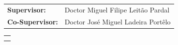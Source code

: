 {\vspace*{15mm}

%
%
\hspace*{-10.5mm}
\begin{tabular}{p{35mm}p{110.5mm}}
{\sffamily\large {\bf Supervisor:}}
& {\sffamily\large Doctor Miguel Filipe Leit\~{a}o Pardal}\smallskip\\
{\sffamily\large {\bf Co-Supervisor:}}
& {\sffamily\large Doctor Jos\'{e} Miguel Ladeira Port\^{e}lo}\smallskip\\
\end{tabular}

\vspace*{15mm}

%
%
\hspace*{-10.5mm}
\begin{tabular}{p{155.5mm}}
\centering{\sffamily\Large Thesis to obtain the Master Degree in}\\
\centering{\sffamily\bfseries\LARGE Information Systems and Computer Engineering}
\end{tabular}

\vspace*{5mm}

%
%

\vfill

}
